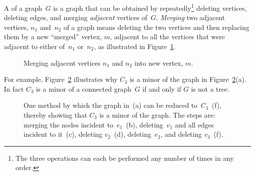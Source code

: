 \begin{definition}
  A  of a graph~$G$ is a graph that can be obtained by
  repeatedly\footnote{The three operations can each be performed any
    number of times in any order.} deleting vertices, deleting edges,
  and merging \emph{adjacent} vertices
  of~$G$.  \emph{Merging} two adjacent vertices, $n_1$ and~$n_2$ of a
  graph means deleting the two vertices and then replacing them by a
  new ``merged'' vertex, $m$, adjacent to all the vertices that were
  adjacent to either of~$n_1$ or~$n_2$, as illustrated in
  Figure~\ref{fig:merged}.
\end{definition}

\begin{figure}


\caption{Merging adjacent vertices $n_1$ and $n_2$ into new vertex, $m$.}
\label{fig:merged}
\end{figure}

For example, Figure~\ref{fig:5DL} illustrates why $C_3$ is a minor of
the graph in Figure~\ref{fig:5DL}(a).  In fact $C_3$ is a minor of a
connected graph~$G$ if and only if $G$ is not a tree.

\begin{figure}



\caption{One method by which the graph in~(a) can be reduced
  to~$C_3$~(f), thereby showing that $C_3$ is a minor of the graph.
  The steps are: merging the nodes incident to~$e_1$~(b),
  deleting~$v_1$ and all edges incident to it~(c), deleting $v_2$~(d),
deleting~$e_2$, and deleting $v_3$~(f).}

\label{fig:5DL}
\end{figure}


